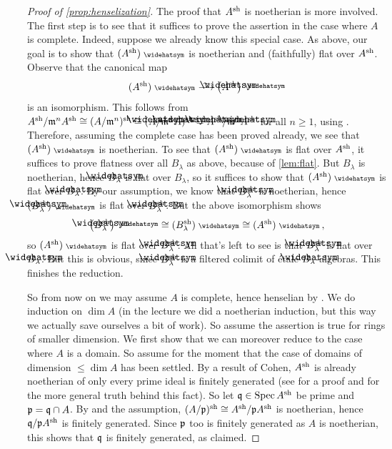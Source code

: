 \documentclass[a4paper, 10pt, oneside, DIV=9, chapterprefix=true, numbers=enddot, bibliography=totoc]{scrbook}
\begin{document}
\begin{proof}[Proof of \cref{prop:henselization}]
	The proof that $A^{\mathrm{sh}}$ is noetherian is more involved. The first step is to see that it suffices to prove the assertion in the case where $A$ is complete. Indeed, suppose we already know this special case. As above, our goal is to show that $(A^\sh)^\complete$ is noetherian and (faithfully) flat over $A^{\mathrm{sh}}$. Observe that the canonical map
	\begin{equation}\label{eq:AshComplete}
		(A^\sh)^\complete\isomorphism \big(\roof{A}^\sh\big)^\complete
	\end{equation}
	is an isomorphism. This follows from $A^\sh/\mm^nA^\sh\cong (A/\mm^n)^\sh\cong (\roof{A}/\mm^n\roof{A})^\sh\cong \roof{A}^\sh/\mm^n\roof{A}^\sh$ for all $n\geq 1$, using . Therefore, assuming the complete case has been proved already, we see that $(A^\sh)^\complete$ is noetherian. To see that $(A^\sh)^\complete$ is flat over $A^{\mathrm{sh}}$, it suffices to prove flatness over all $B_\lambda$ as above, because of \cref{lem:flat}. But $B_\lambda$ is noetherian, hence $\roof{B}_\lambda$ is flat over $B_\lambda$, so it suffices to show that $(A^\sh)^\complete$ is flat over $\roof{B}_\lambda$. By our assumption, we know that $\roof{B}_\lambda^\sh$ is noetherian, hence $(\roof{B}_\lambda^\sh)^\complete$ is flat over $\roof{B}_\lambda^\sh$. But the above isomorphism shows
	\begin{equation*}
		\big(\roof{B}_\lambda^\sh\big)^\complete\cong (B_\lambda^\sh)^\complete\cong (A^\sh)^\complete\,,
	\end{equation*}
	so $(A^\sh)^\complete$ is flat over $\roof{B}_\lambda^\sh$. All that's left to see is that $\roof{B}_\lambda^\sh$ is flat over $\roof{B}_\lambda$. But this is obvious, since $\roof{B}_\lambda^\sh$ is a filtered colimit of étale $\roof{B}_\lambda$-algebras. This finishes the reduction.
	
	So from now on we may assume $A$ is complete, hence henselian by . We do induction on $\dim A$ (in the lecture we did a noetherian induction, but this way we actually save ourselves a bit of work). So assume the assertion is true for rings of smaller dimension. We first show that we can moreover reduce to the case where $A$ is a domain. So assume for the moment that the case of domains of dimension $\leq \dim A$ has been settled. By a result of Cohen, $A^{\mathrm{sh}}$ is already noetherian of only every prime ideal is finitely generated (see \cite[Theorem~3.4]{matsumuraCRT} for a proof and \cite[]{stacks-project} for the more general truth behind this fact). So let $\mathfrak{q}\in\operatorname{Spec} A^{\mathrm{sh}}$ be prime and $\mathfrak{p}=\mathfrak{q}\cap A$. By  and the assumption, $(A/\mathfrak{p})^{\mathrm{sh}}\cong A^{\mathrm{sh}}/\mathfrak{p} A^{\mathrm{sh}}$ is noetherian, hence $\mathfrak{q}/\mathfrak{p} A^{\mathrm{sh}}$ is finitely generated. Since $\mathfrak{p}$ too is finitely generated as $A$ is noetherian, this shows that $\mathfrak{q}$ is finitely generated, as claimed.
	

\end{proof}
\end{document}
